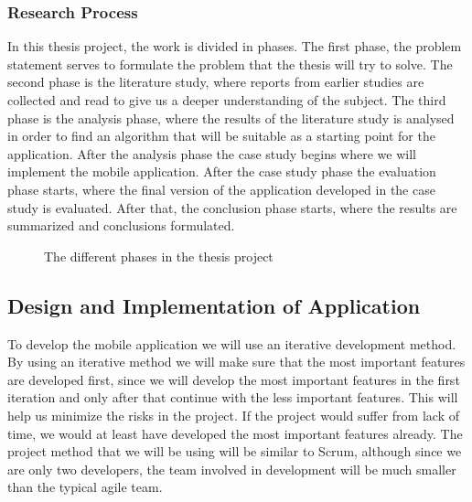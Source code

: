 \documentclass[12pt, a4paper, onecolumn]{article}
\begin{document}
	\subsubsection{Research Process}
	
	In this thesis project, the work is divided in phases. The first phase, the problem statement serves to formulate the problem that the thesis will try to solve. The second phase is the literature study, where reports from earlier studies are collected and read to give us a deeper understanding of the subject. The third phase is the analysis phase, where the results of the literature study is analysed in order to find an algorithm that will be suitable as a starting point for the application. After the analysis phase the case study begins where we will implement the mobile application. After the case study phase the evaluation phase starts, where the final version of the application developed in the case study is evaluated. After that, the conclusion phase starts, where the results are summarized and conclusions formulated. 
	
	\begin{figure}[h]
		\centering
		\caption{The different phases in the thesis project}%
		\label{fig:example}%
	\end{figure}
	
	\subsection{Design and Implementation of Application}
	
	To develop the mobile application we will use an iterative development method. By using an iterative method we will make sure that the most important features are developed first, since we will develop the most important features in the first iteration and only after that continue with the less important features. This will help us  minimize the risks in the project. If the project would suffer from lack of time, we would at least have developed the most important features already. The project method that we will be using will be similar to Scrum, although since we are only two developers, the team involved in development will be much smaller than the typical agile team.
	
\end{document}
